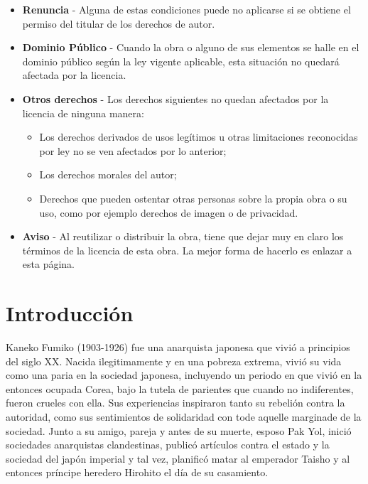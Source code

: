 \documentclass[
]{book}
\begin{document}
\begin{itemize}
\item
  \textbf{Renuncia} - Alguna de estas condiciones puede no aplicarse si se obtiene
  el permiso del titular de los derechos de autor.
\item
  \textbf{Dominio Público} - Cuando la obra o alguno de sus elementos se halle en
  el dominio público según la ley vigente aplicable, esta situación no quedará
  afectada por la licencia.
\item
  \textbf{Otros derechos} - Los derechos siguientes no quedan afectados por
  la licencia de ninguna manera:

  \begin{itemize}
  \item
    Los derechos derivados de usos legítimos u otras limitaciones
    reconocidas por ley no se ven afectados por lo anterior;
  \item
    Los derechos morales del autor;
  \item
    Derechos que pueden ostentar otras personas sobre la propia obra o
    su uso, como por ejemplo derechos de imagen o de privacidad.
  \end{itemize}
\item
  \textbf{Aviso} - Al reutilizar o distribuir la obra, tiene que dejar muy en claro
  los términos de la licencia de esta obra. La mejor forma de hacerlo es
  enlazar a esta página.
\end{itemize}

\hypertarget{introducciuxf3n}{%
\chapter*{Introducción}\label{introducciuxf3n}}

Kaneko Fumiko (1903-1926) fue una anarquista japonesa que vivió a principios del siglo XX. Nacida ilegitimamente y en una pobreza extrema, vivió su vida como una paria en la sociedad japonesa, incluyendo un periodo en que vivió en la entonces ocupada Corea, bajo la tutela de parientes que cuando no indiferentes, fueron crueles con ella. Sus experiencias inspiraron tanto su rebelión contra la autoridad, como sus sentimientos de solidaridad con tode aquelle marginade de la sociedad. Junto a su amigo, pareja y antes de su muerte, esposo Pak Yol, inició sociedades anarquistas clandestinas, publicó artículos contra el estado y la sociedad del japón imperial y tal vez, planificó matar al emperador Taisho y al entonces príncipe heredero Hirohito el día de su casamiento.
\end{document}
